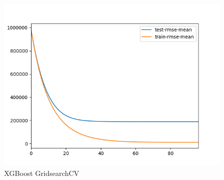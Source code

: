 \begin{figure}[h]
  \centering
  \includegraphics[width=\linewidth]{images/anhang/xgboost.png}
  \caption{XGBoost GridsearchCV} 
\end{figure}